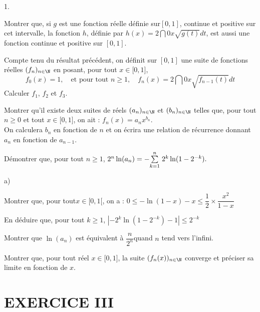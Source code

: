 \documentclass[11pt]{article}%
\begin{document}
\begin{noliste}{1.}
 \setlength{\itemsep}{4mm}
\item Montrer que, si $g$ est une fonction réelle définie sur$[0,1]$,
continue et positive sur cet intervalle, la fonction $h$, définie par
$h(x) = 2\dint{0}{x}\sqrt{g(t)}dt$, est aussi une fonction continue et
positive sur $[0,1].$

\item Compte tenu du résultat précédent, on définit sur $[0,1]$ une
suite de
fonctions réelles $(f_{n})_{n\in \N}$ en posant, pour tout $x\in
\lbrack 0,1]$, 
\[
f_{0}(x) = 1,\quad \text{et pour tout }n\geq 1,\quad
f_{n}(x) = 2\dint{0}{x}\sqrt{f_{n-1}(t)}dt
\]
Calculer $f_{1}$, $f_{2}$ et $f_{3}$.

\item Montrer qu'il existe deux suites de réels $(a_{n})_{n\in \N}$
et $(b_{n})_{n\in \N}$ telles que, pour tout $n\geq 0$ et tout $x\in
\lbrack 0,1]$, on ait : $f_{n}(x) = a_{n}x^{b_{n}}.$\\
On calculera $b_{n}$ en fonction de $n$ et on écrira une relation de
récurrence donnant $a_{n}$ en fonction de $a_{n-1}$.

\item Démontrer que, pour tout $n\geq 1$, $2^{n}\ln
(a_{n}) = -{\textstyle\sum\limits_{k = 1}^{n}}\hspace{.1cm}2^{k}\ln (1-2^{-k}).$

\item 

\begin{noliste}{a)}
 \setlength{\itemsep}{2mm}
\item Montrer que, pour tout$x\in \lbrack 0,1[$, on a : $0\leq -\ln
(1-x)-x\leq \dfrac{1}{2}\times \dfrac{x^{2}}{1-x}$

\item En déduire que, pour tout $k\geq 1$, $\left| -2^{k}\ln
(1-2^{-k})-1\right| \leq 2^{-k}$

\item Montrer que $\ln (a_{n})$ est équivalent à
$\dfrac{n}{2^{n}}$quand $n$
tend vers l'infini.
\end{noliste}

\item Montrer que, pour tout réel $x\in \lbrack 0,1]$, la suite
$(f_{n}(x))_{n\in \N}$ converge et préciser sa limite en fonction de
$x$.
\end{noliste}

\section*{EXERCICE III}
\end{document}

